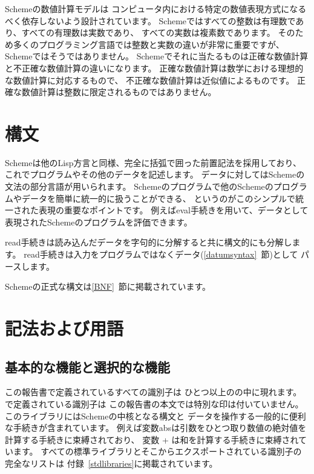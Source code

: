\vest Schemeの数値計算モデルは
コンピュータ内における特定の数値表現方式になるべく依存しないよう設計されています。
Schemeではすべての整数は有理数であり、すべての有理数は実数であり、
すべての実数は複素数であります。
そのため多くのプログラミング言語では整数と実数の違いが非常に重要ですが、
Schemeではそうではありません。
Schemeでそれに当たるものは正確な数値計算と不正確な数値計算の違いになります。
正確な数値計算は数学における理想的な数値計算に対応するもので、
不正確な数値計算は近似値によるものです。
正確な数値計算は整数に限定されるものではありません。

\section{構文}

Schemeは他のLisp方言と同様、完全に括弧で囲った前置記法を採用しており、
これでプログラムやその他のデータを記述します。
データに対してはSchemeの文法の部分言語が用いられます。
Schemeのプログラムで他のSchemeのプログラムやデータを簡単に統一的に扱うことができる、
というのがこのシンプルで統一された表現の重要なポイントです。
例えば{\cf eval}手続きを用いて、データとして表現されたSchemeのプログラムを評価できます。

{\cf read}手続きは読み込んだデータを字句的に分解すると共に構文的にも分解します。
{\cf read}手続きは入力をプログラムではなくデータ(\ref{datumsyntax}~節)として
パースします。

Schemeの正式な構文は\ref{BNF}~節に掲載されています。


\section{記法および用語}


\subsection{基本的な機能と選択的な機能}
\label{qualifiers}

この報告書で定義されているすべての識別子は
ひとつ以上のの中に現れます。
で定義されている識別子は
この報告書の本文では特別な印は付いていません。
このライブラリにはSchemeの中核となる構文と
データを操作する一般的に便利な手続きが含まれています。
例えば変数{\cf abs}は引数をひとつ取り数値の絶対値を計算する手続きに束縛されており、
変数 {\cf +} は和を計算する手続きに束縛されています。
すべての標準ライブラリとそこからエクスポートされている識別子の完全なリストは
付録~\ref{stdlibraries}に掲載されています。

